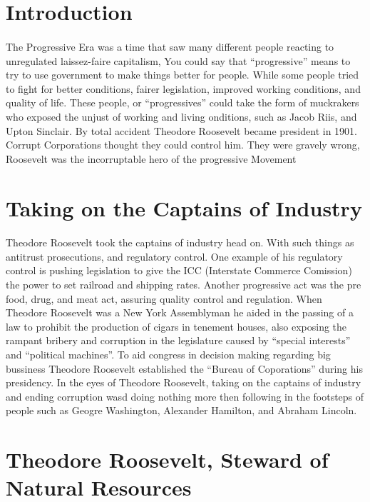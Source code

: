 \section{Introduction}
\paragraph{}
The Progressive Era was a time that saw many different people reacting to
unregulated laissez-faire capitalism, You could say that ``progressive''
means to try to use government to make things better for people.
While some people tried to fight for better conditions, fairer legislation,
improved working conditions, and quality of life. These people, or ``progressives''
could take the form of muckrakers who exposed the unjust of working and living
onditions, such as Jacob Riis, and Upton Sinclair. By total accident Theodore
Roosevelt became president in 1901. Corrupt Corporations thought they could
control him. They were gravely wrong, Roosevelt was the incorruptable hero
of the progressive Movement

\section{Taking on the Captains of Industry}
\paragraph{}
Theodore Roosevelt took the captains of industry head on. With such things as
antitrust prosecutions, and regulatory control. One example of his regulatory
control is pushing legislation to give the ICC (Interstate Commerce Comission)
the power to set railroad and shipping rates. Another progressive act was the
pre food, drug, and meat act, assuring quality control and regulation. When
Theodore Roosevelt was a New York Assemblyman he aided in the passing of a law
to prohibit the production of cigars in tenement houses, also exposing the
rampant bribery and corruption in the legislature caused by
``special interests'' and ``political machines''. To aid congress in decision
making regarding big bussiness Theodore Roosevelt established the ``Bureau
of Coporations'' during his presidency. In the eyes of Theodore Roosevelt,
taking on the captains of industry and ending corruption wasd doing nothing
more then following in the footsteps of people such as Geogre Washington,
Alexander Hamilton, and Abraham Lincoln.

\section{Theodore Roosevelt, Steward of Natural Resources}
